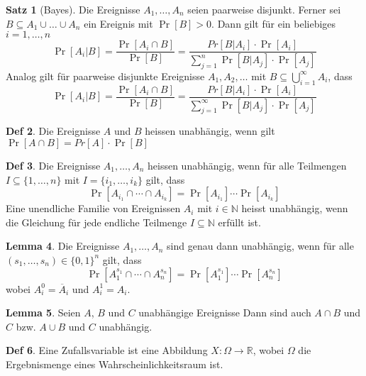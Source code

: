 \documentclass[a4paper, 10pt]{article}
\theoremstyle{definition}
\newtheorem{definition}{Def}[section]
\newtheorem{theorem}[definition]{Satz}
\newtheorem{nlemma}[definition]{Lemma}
\theoremstyle{named}
\newcommand{\R}{\mathbb{R}}
\newcommand{\N}{\mathbb{N}}
\begin{document}
\setcounter{definition}{14}
\begin{theorem}[Bayes]
    Die Ereignisse $A_1, \ldots, A_n$ seien paarweise disjunkt. Ferner sei $B \subseteq A_1 \cup \ldots \cup A_n$ ein Ereignis mit $\Pr[B] > 0$. Dann gilt für ein beliebiges $i = 1, \ldots, n$
    $$\Pr[A_i | B] = \frac{\Pr[A_i \cap B]}{\Pr[B]} = \frac{Pr[B | A_i] \cdot \Pr[A_i]}{\sum_{j = 1}^n \Pr[B | A_j] \cdot \Pr[A_j]}$$
    Analog gilt für paarweise disjunkte Ereignisse $A_1, A_2, \ldots$ mit $B \subseteq \bigcup_{i = 1}^\infty A_i$, dass
    $$\Pr[A_i | B] = \frac{\Pr[A_i \cap B]}{\Pr[B]} = \frac{Pr[B | A_i] \cdot \Pr[A_i]}{\sum_{j = 1}^\infty \Pr[B | A_j] \cdot \Pr[A_j]}$$
\end{theorem}

\setcounter{definition}{17}
\begin{definition}
    Die Ereignisse $A$ und $B$ heissen unabhängig, wenn gilt $\Pr[A \cap B] = Pr[A] \cdot \Pr[B]$
\end{definition}

\setcounter{definition}{21}
\begin{definition}
    Die Ereignisse $A_1, \ldots, A_n$ heissen unabhängig, wenn für alle Teilmengen $I \subseteq \{1, \ldots, n\}$ mit $I = \{i_1, \ldots, i_k\}$ gilt, dass
    $$\Pr[A_{i_1} \cap \cdots \cap A_{i_k}] = \Pr[A_{i_1}] \cdots \Pr[A_{i_k}]$$
    Eine unendliche Familie von Ereignissen $A_i$ mit $i \in \N$ heisst unabhängig, wenn die Gleichung für jede endliche Teilmenge $I \subseteq \N$ erfüllt ist.
\end{definition}

\begin{nlemma}
    Die Ereignisse $A_1, \ldots, A_n$ sind genau dann unabhängig, wenn für alle $(s_1, \ldots, s_n) \in \{0, 1\}^n$ gilt, dass
    $$\Pr[A_1^{s_1} \cap \cdots \cap A_n^{s_n}] = \Pr[A_1^{s_1}] \cdots \Pr[A_n^{s_n}]$$
    wobei $A_i^0 = \overline{A}_i$ und $A_i^1 = A_i$.
\end{nlemma}

\begin{nlemma}
    Seien $A$, $B$ und $C$ unabhängige Ereignisse Dann sind auch $A \cap B$ und $C$ bzw. $A \cup B$ und $C$ unabhängig.
\end{nlemma}

\begin{definition}
    Eine Zufallsvariable ist eine Abbildung $X: \Omega \to \R$, wobei $\Omega$ die Ergebnismenge eines Wahrscheinlichkeitsraum ist.
\end{definition}
\end{document}
